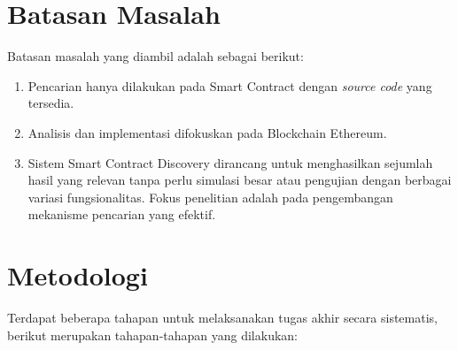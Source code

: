 \section{Batasan Masalah}
\label{sec:batasan-masalah}


Batasan masalah yang diambil adalah sebagai berikut:

\begin{enumerate}
  \item Pencarian hanya dilakukan pada Smart Contract dengan \textit{source code} yang tersedia.
  \item Analisis dan implementasi difokuskan pada Blockchain Ethereum.
  \item Sistem Smart Contract Discovery dirancang untuk menghasilkan sejumlah hasil yang relevan tanpa perlu simulasi besar atau pengujian dengan berbagai variasi fungsionalitas. Fokus penelitian adalah pada pengembangan mekanisme pencarian yang efektif.
\end{enumerate}


\section{Metodologi}
\label{sec:metodologi}


Terdapat beberapa tahapan untuk melaksanakan tugas akhir secara sistematis, berikut merupakan tahapan-tahapan yang dilakukan:

